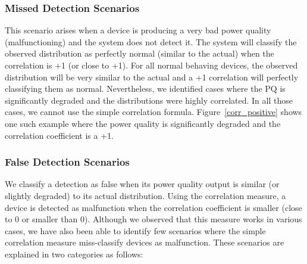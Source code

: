 \documentclass[12pt,oneside]{book}
\begin{document}
\subsubsection{Missed Detection Scenarios}
This scenario arises when a device is producing a very bad power quality (malfunctioning) and the system does not detect it. The system will classify the observed distribution as perfectly normal (similar to the actual) when the correlation is +1 (or close to +1). For all normal behaving devices, the observed distribution will be very similar to the actual and a +1 correlation will perfectly classifying them as normal. Nevertheless, we identified cases where the PQ is significantly degraded and the distributions were highly correlated. In all those cases, we cannot use the simple correlation formula. Figure~\ref{corr_positive} shows one such example where the power quality is significantly degraded and the correlation coefficient is a +1.

\subsubsection{False Detection Scenarios}
We classify a detection as false when its power quality output is similar (or slightly degraded) to its actual distribution. Using the correlation measure, a device is detected as malfunction when the correlation coefficient is smaller (close to 0 or smaller than 0). Although we observed that this measure works in various cases, we have also been able to identify few scenarios where the simple correlation measure miss-classify devices as malfunction. These scenarios are explained in two categories as follows:
\end{document}
